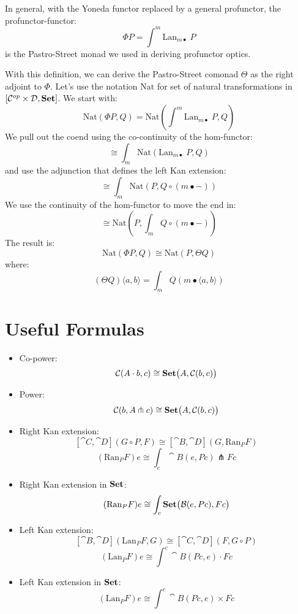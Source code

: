 \documentclass[DaoFP]{subfiles}
\begin{document}
In general, with the Yoneda functor replaced by a general profunctor, the profunctor-functor:
\[ \Phi P = \int^m \text{Lan}_{m \bullet} \; P \]
is the Pastro-Street monad we used in deriving profunctor optics.

With this definition, we can derive the Pastro-Street comonad $\Theta$ as the right adjoint to $\Phi$. Let's use the notation $\text{Nat}$ for set of natural transformations in $[\mathcal{C}^{op} \times \mathcal{D}, \mathbf{Set}]$. We start with:
\[ \text{Nat}(\Phi P, Q) = \text{Nat}(\int^m \text{Lan}_{m \bullet} \;P, Q) \]
We pull out the coend using the co-continuity of the hom-functor:
\[\cong \int_m\text{Nat}( \text{Lan}_{m \bullet}\; P, Q) \]
 and use the adjunction that defines the left Kan extension:
\[ \cong \int_m\text{Nat}(P, Q \circ (m \bullet -)) \]
We use the continuity of the hom-functor to move the end in:
\[ \cong\text{Nat}(P,  \int_m Q \circ (m \bullet -)) \]
The result is:
\[ \text{Nat}(\Phi P, Q) \cong\text{Nat}(P,  \Theta Q) \]
where:
\[ (\Theta Q)\langle a, b \rangle = \int_m Q (m \bullet \langle a, b \rangle) \]


\section{Useful Formulas}
\begin{itemize}
\item Co-power:
\[ \mathcal{C} (A \cdot b, c) \cong \mathbf{Set} \big( A, \mathcal{C} (b, c)\big) \]
\item Power:
\[ \mathcal{C} (b, A \pitchfork c) \cong \mathbf{Set}  \big(A, \mathcal{C}(b, c)\big) \]
\item Right Kan extension:
\[ [\cat C, \cat D](G \circ P, F) \cong [\cat B, \cat D](G, \text{Ran}_P F) \]
 \[ (\text{Ran}_P F) e \cong \int_c \cat B (e, P c) \pitchfork F c \]
\item Right Kan extension in $\mathbf{Set}$:
  \[ (\text{Ran}_P F) e \cong \int_c \mathbf{Set} \big( \mathcal{B} (e, P c), F c\big) \]
\item Left Kan extension:
\[ [\cat B, \cat D](\text{Lan}_P F , G) \cong  [\cat C, \cat D] (F, G \circ P) \]
\[ (\text{Lan}_P F) e \cong \int^{c} \cat B(P c, e) \cdot F c \]
\item Left Kan extension in $\mathbf{Set}$:
\[ (\text{Lan}_P F) e \cong \int^{c} \cat B (P c, e) \times F c \]


\end{itemize}
\end{document}
